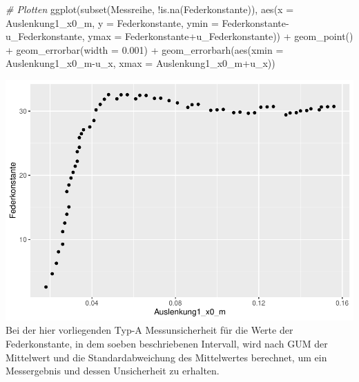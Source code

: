 \documentclass[
]{article}
\newenvironment{Shaded}{\begin{snugshade}}{\end{snugshade}}
\newcommand{\AttributeTok}[1]{\textcolor[rgb]{0.77,0.63,0.00}{#1}}
\newcommand{\CommentTok}[1]{\textcolor[rgb]{0.56,0.35,0.01}{\textit{#1}}}
\newcommand{\FloatTok}[1]{\textcolor[rgb]{0.00,0.00,0.81}{#1}}
\newcommand{\FunctionTok}[1]{\textcolor[rgb]{0.00,0.00,0.00}{#1}}
\newcommand{\NormalTok}[1]{#1}
\newcommand{\SpecialCharTok}[1]{\textcolor[rgb]{0.00,0.00,0.00}{#1}}
\begin{document}
\begin{Shaded}
\begin{Highlighting}[]
\CommentTok{\# Plotten}
\FunctionTok{ggplot}\NormalTok{(}\FunctionTok{subset}\NormalTok{(Messreihe, }\SpecialCharTok{!}\FunctionTok{is.na}\NormalTok{(Federkonstante)), }\FunctionTok{aes}\NormalTok{(}\AttributeTok{x =}\NormalTok{ Auslenkung1\_x0\_m, }
                                                      \AttributeTok{y =}\NormalTok{ Federkonstante,}
                                                      \AttributeTok{ymin =}\NormalTok{ Federkonstante}\SpecialCharTok{{-}}\NormalTok{u\_Federkonstante,}
                                                      \AttributeTok{ymax =}\NormalTok{ Federkonstante}\SpecialCharTok{+}\NormalTok{u\_Federkonstante)) }\SpecialCharTok{+} 
  \FunctionTok{geom\_point}\NormalTok{() }\SpecialCharTok{+} 
  \FunctionTok{geom\_errorbar}\NormalTok{(}\AttributeTok{width =} \FloatTok{0.001}\NormalTok{) }\SpecialCharTok{+}
  \FunctionTok{geom\_errorbarh}\NormalTok{(}\FunctionTok{aes}\NormalTok{(}\AttributeTok{xmin =}\NormalTok{ Auslenkung1\_x0\_m}\SpecialCharTok{{-}}\NormalTok{u\_x,}
                     \AttributeTok{xmax =}\NormalTok{ Auslenkung1\_x0\_m}\SpecialCharTok{+}\NormalTok{u\_x))}
\end{Highlighting}
\end{Shaded}

\includegraphics{DehnbareStoffe_files/figure-latex/unnamed-chunk-8-1.pdf}
Bei der hier vorliegenden Typ-A Messunsicherheit für die Werte der
Federkonstante, in dem soeben beschriebenen Intervall, wird nach GUM der
Mittelwert und die Standardabweichung des Mittelwertes berechnet, um ein
Messergebnis und dessen Unsicherheit zu erhalten.
\end{document}
